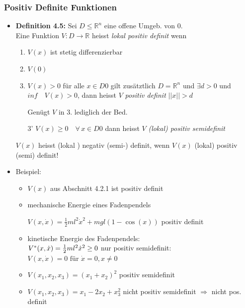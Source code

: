 \documentclass[11pt,a4paper]{article}
\begin{document}
\subsubsection{Positiv Definite Funktionen}
\begin{itemize}
\item \textbf{Definition 4.5:} Sei $D \le \mathbb{R}^n $ eine offene Umgeb. von 0.\\
Eine Funktion $V: D\rightarrow \mathbb{R}$ heisst \textit{lokal positiv definit} wenn
\begin{enumerate}
\item $V(x) $ ist stetig differenzierbar
\item $V(0)$ 
\item $V(x)> 0$ für alle $x \in D {0} $ gilt zusätztlich $D = \mathbb{R}^n $ und $\exists d> 0$ und $inf\quad V(x) > 0 $, dann heisst $V$ \textit{positiv definit} $ ||x|| > d$

Genügt $V$ in 3. lediglich der Bed.\\
\item [3'] $V(x) \ge 0 \quad \forall \, x\in D {0} $ dann heisst $V$ \textit{(lokal) positiv semidefinit}
\end{enumerate} 
$V(x)$ heisst (lokal ) negativ (semi-) definit, wenn \textit{ $V(x)$} (lokal) positiv (semi) definit!
\item Beispiel: 
\begin{itemize}
\item $V(x)$ aus Abschnitt 4.2.1 ist positiv definit
\item mechanische Energie eines Fadenpendels 
\begin{figure}[H] 
  \centering 
  \def\svgwidth{300pt} 
   
\end{figure} 
$V(x, \dot x) = \frac{1}{2} m l^2 \dot x^2 + m g l (1-\cos(x))$ positiv definit
\item kinetische Energie des Fadenpendels: \\$
V^* (x, \dot x) = \frac{1}{2} ml^2 \dot x^2 \ge 0\\
$
nur positiv semidefinit: $V(x, \dot x) = 0 \text{ für } \dot x = 0, x\ne 0$
\item $V(x_1,x_2,x_3) = (x_1 + x_2)^2$ positiv semidefinit
\item $V(x_1, x_2,x_3) = x_1 - 2x_2 + x_3^2$ nicht positiv semidefinit $\Rightarrow$ nicht pos. definit
\end{itemize}
\end{itemize}
\end{document}
